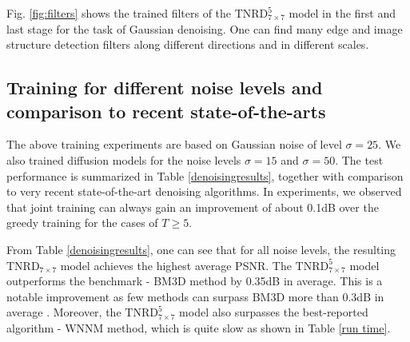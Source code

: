 \documentclass[10pt,journal,compsoc]{IEEEtran}
\begin{document}
Fig. \ref{fig:filters} shows the trained filters 
of the $\text{TNRD}^5_{7\times 7}$ model in the 
first and last stage for the task of Gaussian denoising. One can find many edge and image structure detection filters along 
different directions and in different scales. 

\subsection{Training for different 
noise levels and comparison to recent state-of-the-arts}
The above training experiments are based on Gaussian noise of level $\sigma = 25$. 
We also trained diffusion models for the noise levels $\sigma = 15$ and $\sigma = 50$. 
The test performance is summarized in Table \ref{denoisingresults}, together with comparison to very recent 
state-of-the-art denoising algorithms. 
In experiments, we observed that joint training can always gain an improvement of about 0.1dB 
over the greedy training for the cases of $T \geq 5$. 

From Table \ref{denoisingresults}, one can see that for all noise levels, 
the resulting $\text{TNRD}_{7\times 7}$ model achieves the highest average PSNR. 
The $\text{TNRD}^5_{7\times 7}$ model outperforms the benchmark - 
BM3D method by 0.35dB in average. This is a notable improvement as few methods can surpass BM3D more 
than 0.3dB in average \cite{levin2011natural}. Moreover, the $\text{TNRD}^5_{7\times 7}$ model also surpasses 
the best-reported algorithm - WNNM method, which is quite slow as shown in Table \ref{run time}. 

\begin{comment}
We present a detailed comparison between our learned $\text{TNRD}_{7\times 7}^5$ model and three state-of-the-art methods 
over 68 natural images for noise level $\sigma = 25$ in Figure \ref{fig:comparison}, where the diagonal line $y = x$ means an equal 
performance to ours. One can see that only the WNNM algorithm can outperform ours on few images. 
\end{comment}
\end{document}
